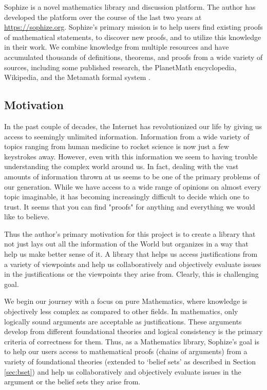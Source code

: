 \documentclass[runningheads]{llncs}
\begin{document}
Sophize is a novel mathematics library and discussion platform. The author has developed the platform over the course of the last two years at \url{https://sophize.org}. Sophize's primary mission is to help users find existing proofs of mathematical statements, to discover new proofs, and to utilize this knowledge in their work. We combine knowledge from multiple resources and have accumulated thousands of definitions, theorems, and proofs from a wide variety of sources, including some published research, the PlanetMath encyclopedia, Wikipedia, and the Metamath formal system \cite{metamath}.

\subsection*{Motivation}

In the past couple of decades, the Internet has revolutionized our life by giving us access to seemingly unlimited information. Information from a wide variety of topics ranging from human medicine to rocket science is now just a few keystrokes away. However, even with this information we seem to having trouble understanding the complex world around us. In fact, dealing with the vast amounts of information thrown at us seems to be one of the primary problems of our generation. While we have access to a wide range of opinions on almost every topic imaginable, it has becoming increasingly difficult to decide which one to trust. It seems that you can find "proofs" for anything and everything we would like to believe.

Thus the author's primary motivation for this project is to create a library that not just lays out all the information of the World but organizes in a way that help us make better sense of it. A library that helps us access justifications from a variety of viewpoints and help us collaboratively and objectively evaluate issues in the justifications or the viewpoints they arise from. Clearly, this is challenging goal. 

We begin our journey with a focus on pure Mathematics, where knowledge is objectively less complex as compared to other fields. In mathematics, only logically sound arguments are acceptable as justifications. These arguments develop from different foundational theories and logical consistency is the primary criteria of correctness for them. Thus, as a Mathematics library, Sophize's goal is to help our users access to mathematical proofs (chains of arguments) from a variety of foundational theories (extended to `belief sets' as described in Section \ref{sec:bset}) and help us collaboratively and objectively evaluate issues in the argument or the belief sets they arise from.
\end{document}

